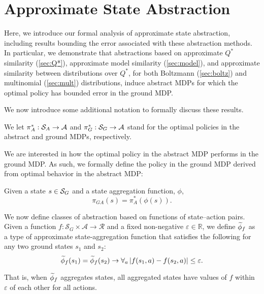 \section{Approximate State Abstraction}

\label{sec:theory_results}
Here, we introduce our formal analysis of approximate state abstraction, including results bounding the error associated with these abstraction methods. In particular, we demonstrate that abstractions based on approximate $Q^*$ similarity (\ref{sec:Q*}), approximate model similarity (\ref{sec:model}), and approximate similarity between distributions over $Q^*$, for both Boltzmann (\ref{sec:boltz}) and multinomial (\ref{sec:mult}) distributions, induce abstract \acp{MDP} for which the optimal policy has bounded error in the ground MDP.

We now introduce some additional notation to formally discuss these results.

We let $\pi_A^* : \mathcal{S}_A \rightarrow \mathcal{A}$ and $\pi_G^* : \mathcal{S}_G \rightarrow \mathcal{A}$ stand for the optimal policies in the abstract and ground \acp{MDP}, respectively.
\edefn

We are interested in how the optimal policy in the abstract \ac{MDP} performs in the ground \ac{MDP}. As such, we formally define the policy in the ground \ac{MDP} derived from optimal behavior in the abstract \ac{MDP}:

Given a state $s \in \mathcal{S}_G$ and a state aggregation function, $\phi$, 
\begin{equation}
\pi_{GA}(s)=\pi_A^*(\phi(s)).
\end{equation}
\edefn

We now define classes of abstraction based on functions of state--action pairs.
Given a function $f: \mathcal{S}_G \times \mathcal{A} \rightarrow \mathcal{R}$ and a fixed non-negative $\varepsilon \in \mathbb{R}$, we define $\widetilde \phi_f$ as a type of approximate state-aggregation function that satisfies the following for any two ground states $s_1$ and $s_2$: 
\begin{equation}
\label{eq:phi_f}
\widetilde \phi_f(s_1) = \widetilde \phi_f(s_2) \rightarrow \forall_a \left|f(s_1, a) - f(s_2, a)\right| \leq \varepsilon.
\end{equation}
\edefn

That is, when $\widetilde \phi_f$ aggregates states, all aggregated states have values of $f$ within $\varepsilon$ of each other for all actions.

